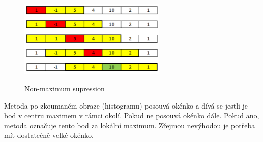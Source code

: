 \documentclass{thesis}%
\begin{document}
 \begin{figure}[htp!]
  
	\centering\includegraphics[width=7cm]{nonmaxsup.png}\\
	\caption[Non-maximum supression]{Non-maximum supression}
\end{figure}
Metoda po zkoumaném obraze (histogramu) posouvá okénko a dívá se jestli je bod v centru maximem v rámci okolí. Pokud ne posouvá okénko dále. Pokud ano, metoda označuje tento bod za lokální maximum. Zřejmou nevýhodou je potřeba mít dostatečně velké okénko.
\end{document}
